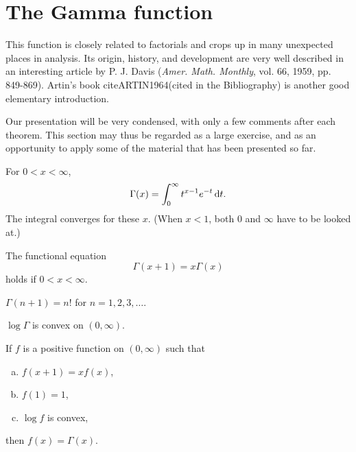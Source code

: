 \section{The Gamma function}

This function is closely related to factorials and crops up in many unexpected places in analysis. 
Its origin, history, and development are very well described in an interesting article by P. J. Davis (\emph{Amer. Math. Monthly}, vol. 66, 1959, pp. 849-869). 
Artin's book cite{ARTIN1964}(cited in the Bibliography) is another good elementary introduction.

Our presentation will be very condensed, with only a few comments after each theorem. 
This section may thus be regarded as a large exercise, and as an opportunity to apply some of the material that has been presented so far.


\begin{mydef}
    \label{mydef:8.17}
    For $0 < x < \infty$,
    \begin{equation}
        \label{eq:8.93}
        \Gamma(x) = \int_{0}^{\infty} t^{x-1} e^{-t} \d t.
    \end{equation}
    The integral converges for these $x$.
    (When $x < 1$, both $0$ and $\infty$ have to be looked at.)
\end{mydef}


\begin{thm}
    \label{thm:8.18}
    \begin{asparaenum}[(a)]
        \item The functional equation
        \begin{equation*}
            \Gamma(x+1) = x\Gamma(x)
        \end{equation*}
        holds if $0 < x < \infty$.
        \item $\Gamma(n+1)=n!$ for $n=1,2,3,\dots$.
        \item $\log \Gamma$ is convex on $(0,\infty)$.
    \end{asparaenum}
\end{thm}


\begin{thm}
    \label{thm:8.19}
    If $f$ is a positive function on $(0, \infty)$ such that
    \begin{enumerate}[(a)]
        \item $f(x+1)=xf(x)$,
        \item $f(1)=1$,
        \item $\log f$ is convex,
    \end{enumerate}
    then $f(x) = \Gamma(x)$.
\end{thm}

